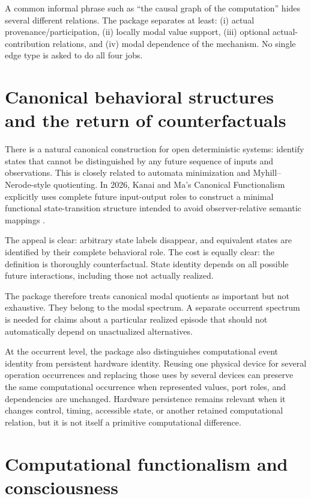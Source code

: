 \documentclass[11pt,a4paper]{article}
\begin{document}
\begin{gapbox}
A common informal phrase such as ``the causal graph of the computation'' hides several different relations. The package separates at least: (i) actual provenance/participation, (ii) locally modal value support, (iii) optional actual-contribution relations, and (iv) modal dependence of the mechanism. No single edge type is asked to do all four jobs.
\end{gapbox}

\section{Canonical behavioral structures and the return of counterfactuals}

There is a natural canonical construction for open deterministic systems: identify states that cannot be distinguished by any future sequence of inputs and observations. This is closely related to automata minimization and Myhill--Nerode-style quotienting. In 2026, Kanai and Ma's Canonical Functionalism explicitly uses complete future input-output roles to construct a minimal functional state-transition structure intended to avoid observer-relative semantic mappings \cite{KanaiMaCanonical2026}.

The appeal is clear: arbitrary state labels disappear, and equivalent states are identified by their complete behavioral role. The cost is equally clear: the definition is thoroughly counterfactual. State identity depends on all possible future interactions, including those not actually realized.

The package therefore treats canonical modal quotients as important but not exhaustive. They belong to the modal spectrum. A separate occurrent spectrum is needed for claims about a particular realized episode that should not automatically depend on unactualized alternatives.

At the occurrent level, the package also distinguishes computational event identity from persistent hardware identity. Reusing one physical device for several operation occurrences and replacing those uses by several devices can preserve the same computational occurrence when represented values, port roles, and dependencies are unchanged. Hardware persistence remains relevant when it changes control, timing, accessible state, or another retained computational relation, but it is not itself a primitive computational difference.

\section{Computational functionalism and consciousness}
\end{document}
